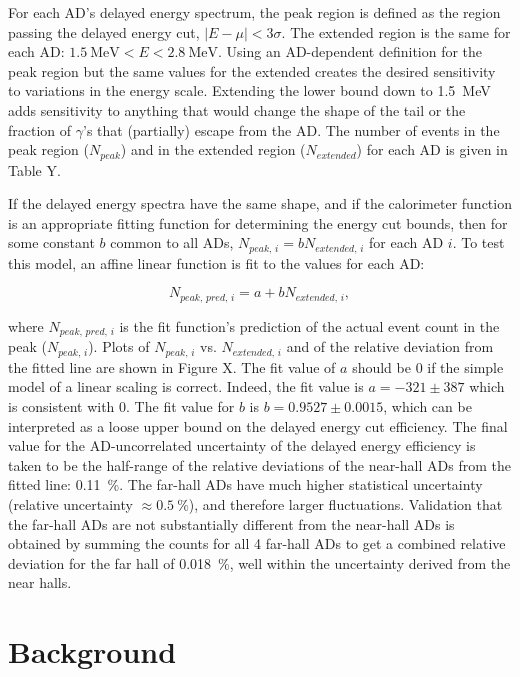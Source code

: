 \documentclass{ucbthesis}
\newcommand{\mev}{\mega\electronvolt}
\begin{document}
For each AD's delayed energy spectrum, the peak region is defined as
the region passing the delayed energy cut, $\vert E-\mu \vert < 3\sigma$.
The extended region is the same for each AD:
$\SI{1.5}{\mev} < E < \SI{2.8}{\mev}$.
Using an AD-dependent definition for the peak region but
the same values for the extended creates
the desired sensitivity to variations in the energy scale.
Extending the lower bound down to \SI{1.5}{\mev} adds sensitivity to
anything that would change the shape of the tail
or the fraction of $\gamma$'s that (partially) escape from the AD.
The number of events in the peak region ($N_{peak}$)
and in the extended region ($N_{extended}$) for each AD
is given in Table Y. %

If the delayed energy spectra have the same shape,
and if the calorimeter function is an appropriate fitting function
for determining the energy cut bounds,
then for some constant $b$ common to all ADs,
$N_{peak,\,i} = b N_{extended,\,i}$ for each AD $i$.
To test this model, an affine linear function is fit
to the values for each AD:

\begin{equation}
    N_{peak,\,pred,\,i} = a + b N_{extended,\,i},
\end{equation}

where $N_{peak,\,pred,\,i}$ is the fit function's prediction
of the actual event count in the peak ($N_{peak,\,i}$).
Plots of $N_{peak,\,i}$ vs. $N_{extended,\,i}$ and of the
relative deviation from the fitted line are shown in Figure X. %
The fit value of $a$ should be $0$ if the simple model of
a linear scaling is correct.
Indeed, the fit value is $a = -321 \pm 387$
which is consistent with $0$.
The fit value for $b$ is $b = 0.9527 \pm 0.0015$,
which can be interpreted as a loose upper bound
on the delayed energy cut efficiency.
The final value for the AD-uncorrelated uncertainty
of the delayed energy efficiency is taken to be
the half-range of the relative deviations
of the near-hall ADs from the fitted line: \SI{0.11}{\percent}.
The far-hall ADs have much higher statistical uncertainty
(relative uncertainty $\approx\SI{0.5}{\percent}$),
and therefore larger fluctuations.
Validation that the far-hall ADs are not
substantially different from the near-hall ADs is obtained by
summing the counts for all 4 far-hall ADs to get
a combined relative deviation for the far hall of \SI{0.018}{\percent},
well within the uncertainty derived from the near halls.




\chapter{Background}
\label{ch:background}
\end{document}
